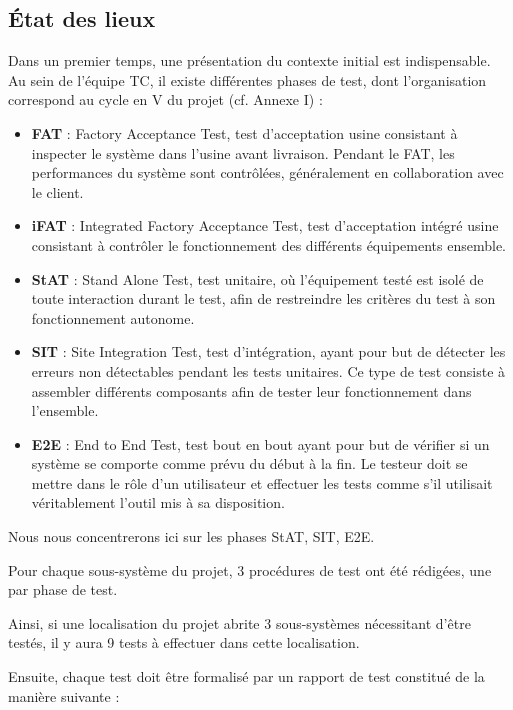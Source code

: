 \subsection{État des lieux}
Dans un premier temps, une présentation du contexte initial est indispensable. Au sein de l'équipe \gls{TC}, il existe différentes phases de test, dont l'organisation correspond au cycle en V du projet (cf. Annexe I) :
\begin{itemize}
\item \textbf{FAT} : Factory Acceptance Test, test d'acceptation usine consistant à inspecter le système dans l'usine avant livraison. Pendant le FAT, les performances du système sont contrôlées, généralement en collaboration avec le client.
\item \textbf{iFAT} : Integrated Factory Acceptance Test, test d'acceptation intégré usine consistant à contrôler le fonctionnement des différents équipements ensemble.
\item \textbf{\gls{StAT}} : Stand Alone Test, test unitaire, où  l'équipement testé est isolé de toute interaction durant le test, afin de restreindre les critères du test à son fonctionnement autonome.
\item \textbf{\gls{SIT}} : Site Integration Test, test d'intégration, ayant pour but de détecter les erreurs non détectables pendant les tests unitaires. Ce type de test consiste à assembler différents composants afin de tester leur fonctionnement dans l'ensemble.
\item \textbf{\gls{E2E}} : End to End Test, test bout en bout ayant pour but de vérifier si un système se comporte comme prévu du début à la fin. Le testeur doit se mettre dans le rôle d’un utilisateur et effectuer les tests comme s’il utilisait véritablement l’outil mis à sa disposition.
\end{itemize}

Nous nous concentrerons ici sur les phases \gls{StAT}, \gls{SIT}, \gls{E2E}.

Pour chaque sous-système du projet, 3 procédures de test ont été rédigées, une par phase de test.

Ainsi, si une localisation du projet abrite 3 sous-systèmes nécessitant d'être testés, il y aura 9 tests à effectuer dans cette localisation.

Ensuite, chaque test doit être formalisé par un rapport de test constitué de la manière suivante :

